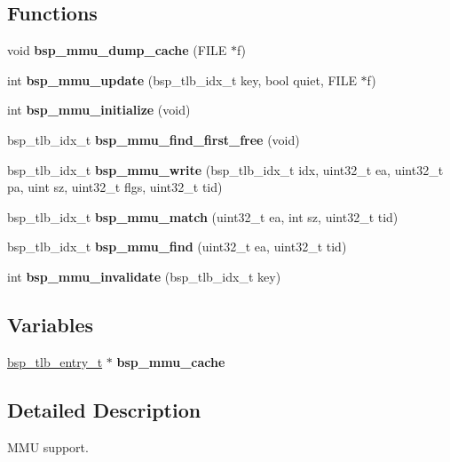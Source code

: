 \subsection*{Functions}
\begin{DoxyCompactItemize}
\item 
\mbox{\label{group__Virtex4MMU_ga4973ad0b91742b14ec5ca6ef8a26eebf}} 
void {\bfseries bsp\+\_\+mmu\+\_\+dump\+\_\+cache} (F\+I\+LE $\ast$f)
\item 
\mbox{\label{group__Virtex4MMU_gab7e0248cc049c644a6651e7d7c1eff91}} 
int {\bfseries bsp\+\_\+mmu\+\_\+update} (bsp\+\_\+tlb\+\_\+idx\+\_\+t key, bool quiet, F\+I\+LE $\ast$f)
\item 
\mbox{\label{group__Virtex4MMU_gab175218f979b05888e9058db2dabbbf5}} 
int {\bfseries bsp\+\_\+mmu\+\_\+initialize} (void)
\item 
\mbox{\label{group__Virtex4MMU_gab9639239ae8b28a22968b37e94b631f4}} 
bsp\+\_\+tlb\+\_\+idx\+\_\+t {\bfseries bsp\+\_\+mmu\+\_\+find\+\_\+first\+\_\+free} (void)
\item 
\mbox{\label{group__Virtex4MMU_ga9183be2c34bb40ed7b2b26c204daadae}} 
bsp\+\_\+tlb\+\_\+idx\+\_\+t {\bfseries bsp\+\_\+mmu\+\_\+write} (bsp\+\_\+tlb\+\_\+idx\+\_\+t idx, uint32\+\_\+t ea, uint32\+\_\+t pa, uint sz, uint32\+\_\+t flgs, uint32\+\_\+t tid)
\item 
\mbox{\label{group__Virtex4MMU_ga346f64269262e527064ac418f57864b0}} 
bsp\+\_\+tlb\+\_\+idx\+\_\+t {\bfseries bsp\+\_\+mmu\+\_\+match} (uint32\+\_\+t ea, int sz, uint32\+\_\+t tid)
\item 
\mbox{\label{group__Virtex4MMU_ga3594738f1db908303d69ffceae99177a}} 
bsp\+\_\+tlb\+\_\+idx\+\_\+t {\bfseries bsp\+\_\+mmu\+\_\+find} (uint32\+\_\+t ea, uint32\+\_\+t tid)
\item 
\mbox{\label{group__Virtex4MMU_gaf6c21bfb5788dfa37945e0101eb2e382}} 
int {\bfseries bsp\+\_\+mmu\+\_\+invalidate} (bsp\+\_\+tlb\+\_\+idx\+\_\+t key)
\end{DoxyCompactItemize}
\subsection*{Variables}
\begin{DoxyCompactItemize}
\item 
\mbox{\label{group__Virtex4MMU_ga9b1be6b3e1758a8b21d3f472436669c1}} 
\mbox{\hyperlink{structbsp__tlb__entry__t}{bsp\+\_\+tlb\+\_\+entry\+\_\+t}} $\ast$ {\bfseries bsp\+\_\+mmu\+\_\+cache}
\end{DoxyCompactItemize}


\subsection{Detailed Description}
M\+MU support. 

